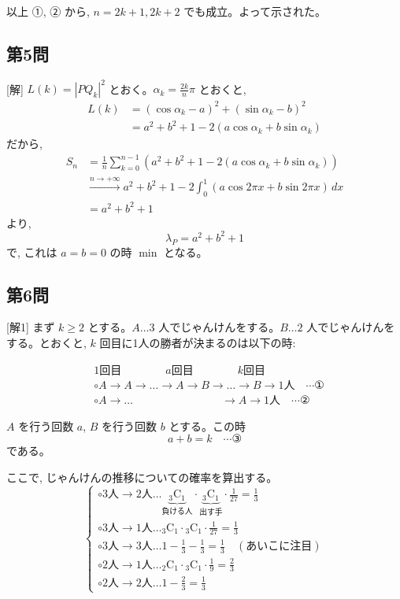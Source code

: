 \documentclass[../main.tex]{subfiles}
\begin{document}
以上 ①, ② から, $n=2k+1, 2k+2$ でも成立。よって示された。 \quad [終]

\subsection*{第5問}

[解] $L(k) = |PQ_k|^2$ とおく。$\alpha_k = \frac{2k}{n}\pi$ とおくと,
\[
  \begin{aligned}
    L(k) &= (\cos \alpha_k - a)^2 + (\sin \alpha_k - b)^2 \\
    &= a^2 + b^2 + 1 - 2 (a \cos \alpha_k + b \sin \alpha_k)
  \end{aligned}
\]
だから,
\[
  \begin{aligned}
    S_n &= \frac{1}{n} \sum_{k=0}^{n-1} \left( a^2 + b^2 + 1 - 2(a \cos \alpha_k + b \sin \alpha_k) \right) \\
    &\xrightarrow{n \to +\infty} a^2 + b^2 + 1 - 2 \int_0^1 (a \cos 2\pi x + b \sin 2\pi x) \, dx \\
    &= a^2 + b^2 + 1
  \end{aligned}
\]
より,
\[
  \lambda_P = a^2 + b^2 + 1
\]
で, これは $a=b=0$ の時 $\min$ となる。

\subsection*{第6問}

[解1] まず $k \ge 2$ とする。$A \dots 3$ 人でじゃんけんをする。$B \dots 2$ 人でじゃんけんをする。とおくと,
$k$ 回目に1人の勝者が決まるのは以下の時:

\[
  \begin{aligned}
    &\text{1回目} \qquad \qquad a\text{回目} \qquad \qquad k\text{回目} \\
    &\circ A \to A \to \dots \to A \to B \to \dots \to B \to 1\text{人} \quad \cdots \text{①} \\
    &\circ A \to \dots \qquad \qquad \qquad \qquad \to A \to 1\text{人} \quad \cdots \text{②}
  \end{aligned}
\]

$A$ を行う回数 $a$, $B$ を行う回数 $b$ とする。この時
\[
  a+b = k \quad \cdots \text{③}
\]
である。

ここで, じゃんけんの推移についての確率を算出する。
\[
  \begin{cases}
    \circ 3\text{人} \to 2\text{人} \dots \underbrace{{}_3\mathrm{C}_1}_{\text{負ける人}} \cdot \underbrace{{}_3\mathrm{C}_1}_{\text{出す手}} \cdot \frac{1}{27} = \frac{1}{3} \\
    \circ 3\text{人} \to 1\text{人} \dots {}_3\mathrm{C}_1 \cdot {}_3\mathrm{C}_1 \cdot \frac{1}{27} = \frac{1}{3} \\
    \circ 3\text{人} \to 3\text{人} \dots 1 - \frac{1}{3} - \frac{1}{3} = \frac{1}{3} \quad (\text{あいこに注目}) \\
    \circ 2\text{人} \to 1\text{人} \dots {}_2\mathrm{C}_1 \cdot {}_3\mathrm{C}_1 \cdot \frac{1}{9} = \frac{2}{3} \\
    \circ 2\text{人} \to 2\text{人} \dots 1 - \frac{2}{3} = \frac{1}{3}
  \end{cases}
\]
\end{document}
